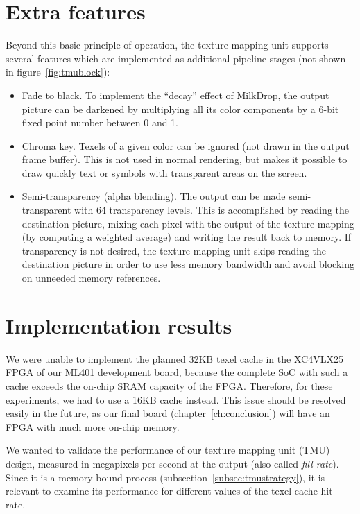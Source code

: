 \documentclass[a4paper,11pt]{kthesis}
\begin{document}
\section{Extra features}
Beyond this basic principle of operation, the texture mapping unit supports several features which are implemented as additional pipeline stages (not shown in figure~\ref{fig:tmublock}):
\begin{itemize}
\item Fade to black. To implement the ``decay'' effect of MilkDrop, the output picture can be darkened by multiplying all its color components by a 6-bit fixed point number between 0 and 1.
\item Chroma key. Texels of a given color can be ignored (not drawn in the output frame buffer). This is not used in normal rendering, but makes it possible to draw quickly text or symbols with transparent areas on the screen.
\item Semi-transparency (alpha blending). The output can be made semi-transparent with 64 transparency levels. This is accomplished by reading the destination picture, mixing each pixel with the output of the texture mapping (by computing a weighted average) and writing the result back to memory. If transparency is not desired, the texture mapping unit skips reading the destination picture in order to use less memory bandwidth and avoid blocking on unneeded memory references.
\end{itemize}

\section{Implementation results}
We were unable to implement the planned 32KB texel cache in the XC4VLX25 FPGA of our ML401 development board, because the complete SoC with such a cache exceeds the on-chip SRAM capacity of the FPGA. Therefore, for these experiments, we had to use a 16KB cache instead. This issue should be resolved easily in the future, as our final board (chapter~\ref{ch:conclusion}) will have an FPGA with much more on-chip memory.

We wanted to validate the performance of our texture mapping unit (TMU) design, measured in megapixels per second at the output (also called \textit{fill rate}). Since it is a memory-bound process (subsection~\ref{subsec:tmustrategy}), it is relevant to examine its performance for different values of the texel cache hit rate.
\end{document}
